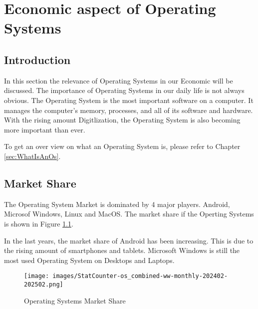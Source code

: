 \chapter{Economic aspect of Operating Systems }
\label{chap:Economic_aspekt_of_Operating_Systems}


\section{Introduction}

In this section the relevance of Operating Systems in our Economic will be discussed. The importance of Operating Systems in our daily life is not always obvious.
The Operating System is the most important software on a computer. It manages the computer's memory, processes, and all of its software and hardware. 
With the rising amount Digitlization, the Operating System is also becoming more important than ever.

To get an over view on what an Operating System is, please refer to Chapter \ref{sec:WhatIsAnOs}.


\section{Market Share}

The Operating System Market is dominated by 4 major players. Android, Microsof Windows, Linux and MacOS.
The market share if the Operting Systems is shown in Figure \ref{fig:Operating_Systems_Market_Share}. 

In the last years, the market share of Android has been increasing. This is due to the rising amount of smartphones and tablets.
Microsoft Windows is still the most used Operating System on Desktops and Laptops.

\begin{figure}[H]
    \centering
    \texttt{[image: images/StatCounter-os\_combined-ww-monthly-202402-202502.png]}
    \caption{Operating Systems Market Share}
    \label{fig:Operating_Systems_Market_Share}
\end{figure}




\cite{OsMarketShare}
\cite{OsMarketShare}
\cite{OsWikipedia}

\author{Florian Prandstetter}